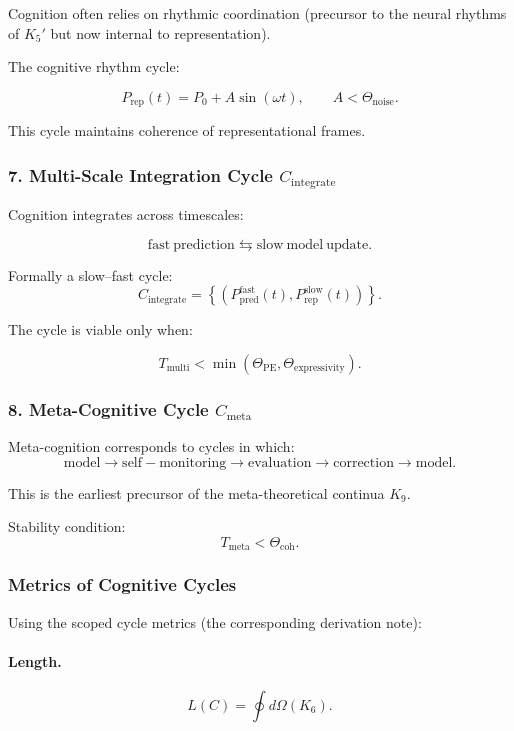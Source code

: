 Cognition often relies on rhythmic coordination (precursor to the
neural rhythms of $K_5'$ but now internal to representation).

The cognitive rhythm cycle:

\[
 P_{\mathrm{rep}}(t) = P_0 + A\sin(\omega t),\qquad
 A < \Theta_{\mathrm{noise}}.
\]

This cycle maintains coherence of representational frames.

\subsubsection{7. Multi-Scale Integration Cycle $C_{\mathrm{integrate}}$}

Cognition integrates across timescales:

\[
 \mathrm{fast\ prediction}
 \leftrightarrows
 \mathrm{slow\ model\ update}.
\]

Formally a slow–fast cycle:
\[
 C_{\mathrm{integrate}} =
 \left\{
   (P_{\mathrm{pred}}^{\mathrm{fast}}(t),
    P_{\mathrm{rep}}^{\mathrm{slow}}(t))
 \right\}.
\]

The cycle is viable only when:

\[
 T_{\mathrm{multi}} < \min(\Theta_{\mathrm{PE}},\Theta_{\mathrm{expressivity}}).
\]

\subsubsection{8. Meta-Cognitive Cycle $C_{\mathrm{meta}}$}

Meta-cognition corresponds to cycles in which:
\[
 \mathrm{model}
 \to
 \mathrm{self-monitoring}
 \to
 \mathrm{evaluation}
 \to
 \mathrm{correction}
 \to
 \mathrm{model}.
\]

This is the earliest precursor of the meta-theoretical continua $K_9$.

Stability condition:
\[
 T_{\mathrm{meta}} < \Theta_{\mathrm{coh}}.
\]

\subsubsection{Metrics of Cognitive Cycles}

Using the scoped cycle metrics (the corresponding derivation note):

\paragraph{Length.}
\[
  L(C)=\oint d\Omega(K_6).
\]

